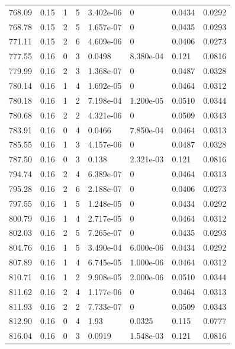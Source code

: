 \documentclass[preview]{standalone}
\begin{document}
{{{{{{{{\begin{tabular}{L{1.2cm}C{1.2cm} C{0.3cm}C{0.5cm} C{1.4cm}C{1.4cm} C{1.4cm}C{1.4cm}}
  768.09  &  0.15  & 1     &  5 &  3.402e-06  & 0  & 0.0434 &  0.0292   \\ 
  768.78  &  0.15  & 2     &  5 &  1.657e-07  & 0  & 0.0435 &  0.0293   \\ 
  771.11  &  0.15  & 2     &  6 &  4.609e-06  & 0  & 0.0406 &  0.0273   \\ 
  777.55  &  0.16  & 0     &  3 &  0.0498  & 8.380e-04  & 0.121 &  0.0816   \\ 
  779.99  &  0.16  & 2     &  3 &  1.368e-07  & 0  & 0.0487 &  0.0328   \\ 
  780.14  &  0.16  & 1     &  4 &  1.692e-05  & 0  & 0.0464 &  0.0312   \\ 
  780.18  &  0.16  & 1     &  2 &  7.198e-04  & 1.200e-05  & 0.0510 &  0.0344   \\ 
  780.68  &  0.16  & 2     &  2 &  4.321e-06  & 0  & 0.0509 &  0.0343   \\ 
  783.91  &  0.16  & 0     &  4 &  0.0466  & 7.850e-04  & 0.0464 &  0.0313   \\ 
  785.55  &  0.16  & 1     &  3 &  4.157e-06  & 0  & 0.0487 &  0.0328   \\ 
  787.50  &  0.16  & 0     &  3 &  0.138  & 2.321e-03  & 0.121 &  0.0816   \\ 
  794.74  &  0.16  & 2     &  4 &  6.389e-07  & 0  & 0.0464 &  0.0313   \\ 
  795.28  &  0.16  & 2     &  6 &  2.188e-07  & 0  & 0.0406 &  0.0273   \\ 
  797.55  &  0.16  & 1     &  5 &  1.248e-05  & 0  & 0.0434 &  0.0292   \\ 
  800.79  &  0.16  & 1     &  4 &  2.717e-05  & 0  & 0.0464 &  0.0312   \\ 
  802.03  &  0.16  & 2     &  5 &  7.265e-07  & 0  & 0.0435 &  0.0293   \\ 
  804.76  &  0.16  & 1     &  5 &  3.490e-04  & 6.000e-06  & 0.0434 &  0.0292   \\ 
  807.89  &  0.16  & 1     &  4 &  6.745e-05  & 1.000e-06  & 0.0464 &  0.0312   \\ 
  810.71  &  0.16  & 1     &  2 &  9.908e-05  & 2.000e-06  & 0.0510 &  0.0344   \\ 
  811.62  &  0.16  & 2     &  4 &  1.177e-06  & 0  & 0.0464 &  0.0313   \\ 
  811.93  &  0.16  & 2     &  2 &  7.733e-07  & 0  & 0.0509 &  0.0343   \\ 
  812.90  &  0.16  & 0     &  4 &  1.93  & 0.0325  & 0.115 &  0.0777   \\ 
  816.04  &  0.16  & 0     &  3 &  0.0919  & 1.548e-03  & 0.121 &  0.0816   \\ 

\end{tabular}}}}}}}}}
\end{document}
